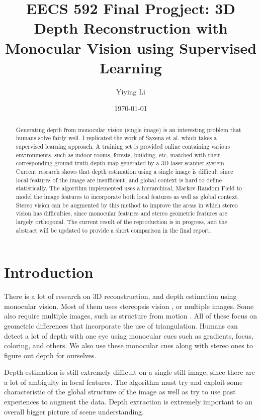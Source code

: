 \documentclass[journal]{IEEEtran}
\title{EECS 592 Final Progject: 3D Depth Reconstruction with Monocular Vision using Supervised Learning}
\author{Yiying Li}
\date{\today}
\begin{document}
\maketitle

\begin{abstract}
Generating depth from monocular vision (single image) is an interesting problem that humans solve fairly well. I replicated the work of Saxena et al. \cite{saxena2008} which takes a supervised learning approach. A training set is provided online containing various environments, such as indoor rooms, forests, building, etc, matched with their corresponding ground truth depth map generated by a 3D laser scanner system. Current research shows that depth estimation using a single image is difficult since local features of the image are insufficient, and global context is hard to define statistically. The algorithm implemented uses a hierarchical, Markov Random Field to model the image features to incorporate both local features as well as global context. Stereo vision can be augmented by this method to improve the areas in which stereo vision has difficulties, since monocular features and stereo geometric features are largely orthogonal. The current result of the reproduction is in progress, and the abstract will be updated to provide a short comparison in the final report.
\end{abstract}

\section{Introduction}
There is a lot of research on 3D reconstruction, and depth estimation using monocular vision. Most of them uses stereopsis vision \cite{scharstein2003}, or multiple images. Some also require multiple images, such as structure from motion \cite{Forsyth:2002:CVM:580035}. All of these focus on geometric differences that incorporate the use of triangulation. Humans can detect a lot of depth with one eye using monocular cues such as gradients, focus, coloring, and others. We also use these monocular cues along with stereo ones to figure out depth for ourselves. 

Depth estimation is still extremely difficult on a single still image, since there are a lot of ambiguity in local features. The algorithm must try and exploit some characteristic of the global structure of the image as well as try to use past experiences to augment the data. Depth extraction is extremely important to an overall bigger picture of scene understanding. 
\end{document}
